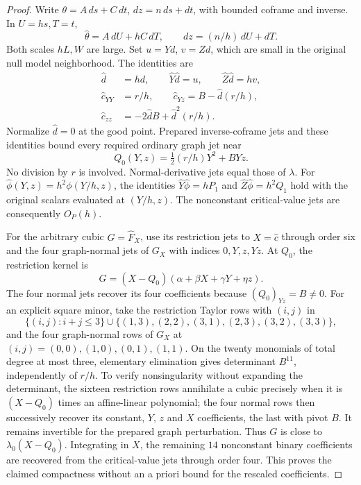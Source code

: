 \documentclass[11pt]{amsart}
\theoremstyle{definition}
\theoremstyle{remark}
\numberwithin{equation}{section}
\begin{document}
\begin{proof}
Write $\theta=A\,ds+C\,dt$, $dz=n\,ds+dt$, with bounded coframe and inverse. In $U=hs,T=t$,
\[
 \widehat\theta=A\,dU+hC\,dT,\qquad dz=(n/h)\,dU+dT.
\]
Both scales $hL,W$ are large. Set $u=Yd$, $v=Zd$, which are small in the original null model neighborhood. The identities are
\[
\begin{aligned}
 \widehat d&=hd,\qquad \widehat Y\widehat d=u,\qquad \widehat Z\widehat d=hv,\\
 \widehat c_{YY}&=r/h,\qquad \widehat c_{Yz}=B-\widehat d(r/h),\\
 \widehat c_{zz}&=-2\widehat dB+\widehat d^2(r/h).
\end{aligned}
\]
Normalize $\widehat d=0$ at the good point. Prepared inverse-coframe jets and these identities bound every required ordinary graph jet near
\[
Q_0(Y,z)=\tfrac12(r/h)Y^2+BYz.
\]
No division by $r$ is involved. Normal-derivative jets equal those of $\lambda$. For $\widehat\phi(Y,z)=h^2\phi(Y/h,z)$, the identities $\widehat Y\widehat\phi=hP_1$ and $\widehat Z\widehat\phi=h^2Q_1$ hold with the original scalars evaluated at $(Y/h,z)$. The nonconstant critical-value jets are consequently $O_P(h)$.

For the arbitrary cubic $G=\widehat F_X$, use its restriction jets to $X=\widehat c$ through order six and the four graph-normal jets of $G_X$ with indices $0,Y,z,Yz$. At $Q_0$, the restriction kernel is
\[
G=(X-Q_0)(\alpha+\beta X+\gamma Y+\eta z).
\]
The four normal jets recover its four coefficients because $(Q_0)_{Yz}=B\ne0$. For an explicit square minor, take the restriction Taylor rows with $(i,j)$ in
\[
 \{(i,j):i+j\le3\}\cup\{(1,3),(2,2),(3,1),(2,3),(3,2),(3,3)\},
\]
and the four graph-normal rows of $G_X$ at $(i,j)=(0,0),(1,0),(0,1),(1,1)$. On the twenty monomials of total degree at most three, elementary elimination gives determinant $B^{11}$, independently of $r/h$. To verify nonsingularity without expanding the determinant, the sixteen restriction rows annihilate a cubic precisely when it is $(X-Q_0)$ times an affine-linear polynomial; the four normal rows then successively recover its constant, $Y$, $z$ and $X$ coefficients, the last with pivot $B$. It remains invertible for the prepared graph perturbation. Thus $G$ is close to $\lambda_0(X-Q_0)$. Integrating in $X$, the remaining $14$ nonconstant binary coefficients are recovered from the critical-value jets through order four. This proves the claimed compactness without an a priori bound for the rescaled coefficients.
\end{proof}
\end{document}
